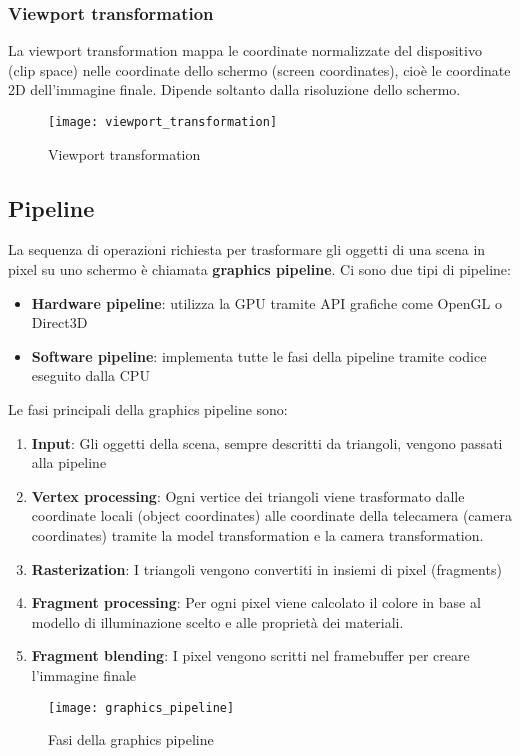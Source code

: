 \documentclass[a4paper]{article}
\begin{document}
\subsubsection{Viewport transformation}
La viewport transformation mappa le coordinate normalizzate del dispositivo (clip space)
nelle coordinate dello schermo (screen coordinates), cioè le coordinate 2D dell'immagine
finale. Dipende soltanto dalla risoluzione dello schermo.
\begin{figure}[H]
  \centering
  \texttt{[image: viewport\_transformation]}
  \caption{Viewport transformation}
\end{figure}

\subsection{Pipeline}
La sequenza di operazioni richiesta per trasformare gli oggetti di una scena in pixel
su uno schermo è chiamata \textbf{graphics pipeline}. Ci sono due tipi di pipeline:
\begin{itemize}
  \item \textbf{Hardware pipeline}: utilizza la GPU tramite API grafiche come OpenGL
    o Direct3D
  \item \textbf{Software pipeline}: implementa tutte le fasi della pipeline tramite codice
    eseguito dalla CPU
\end{itemize}
Le fasi principali della graphics pipeline sono:
\begin{enumerate}
  \item \textbf{Input}: Gli oggetti della scena, sempre descritti da triangoli, vengono
    passati alla pipeline
  \item \textbf{Vertex processing}: Ogni vertice dei triangoli viene trasformato dalle
    coordinate locali (object coordinates) alle coordinate della telecamera (camera coordinates)
    tramite la model transformation e la camera transformation.
  \item \textbf{Rasterization}: I triangoli vengono convertiti in insiemi di pixel (fragments)
  \item \textbf{Fragment processing}: Per ogni pixel viene calcolato il colore in base
    al modello di illuminazione scelto e alle proprietà dei materiali.
  \item \textbf{Fragment blending}: I pixel vengono scritti nel framebuffer per creare
    l'immagine finale
\end{enumerate}
\begin{figure}[H]
  \centering
  \texttt{[image: graphics\_pipeline]}
  \caption{Fasi della graphics pipeline}
\end{figure}
\end{document}
